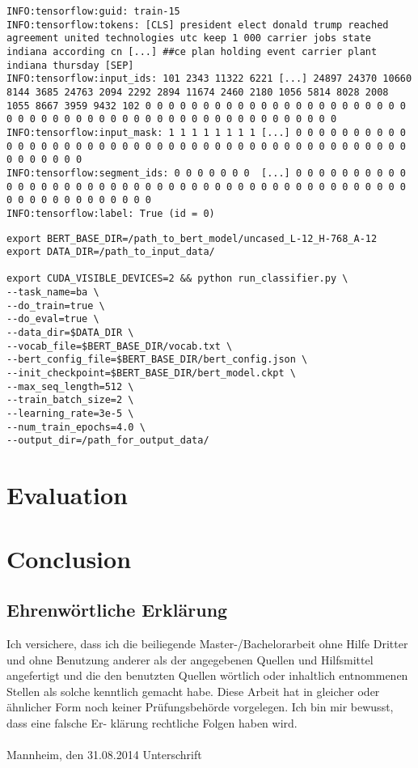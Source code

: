 \documentclass[a4paper, 11pt,titlepage,oneside,openany]{book}
\begin{document}
\noindent \begin{minipage}[t]{\textwidth}
\begin{lstlisting}[caption={TensorFlow Output for InputExampels},captionpos=b, frame = single]
INFO:tensorflow:guid: train-15
INFO:tensorflow:tokens: [CLS] president elect donald trump reached agreement united technologies utc keep 1 000 carrier jobs state indiana according cn [...] ##ce plan holding event carrier plant indiana thursday [SEP]
INFO:tensorflow:input_ids: 101 2343 11322 6221 [...] 24897 24370 10660 8144 3685 24763 2094 2292 2894 11674 2460 2180 1056 5814 8028 2008 1055 8667 3959 9432 102 0 0 0 0 0 0 0 0 0 0 0 0 0 0 0 0 0 0 0 0 0 0 0 0 0 0 0 0 0 0 0 0 0 0 0 0 0 0 0 0 0 0 0 0 0 0 0 0 0 0 0 0
INFO:tensorflow:input_mask: 1 1 1 1 1 1 1 1 [...] 0 0 0 0 0 0 0 0 0 0 0 0 0 0 0 0 0 0 0 0 0 0 0 0 0 0 0 0 0 0 0 0 0 0 0 0 0 0 0 0 0 0 0 0 0 0 0 0 0 0 0 0
INFO:tensorflow:segment_ids: 0 0 0 0 0 0 0  [...] 0 0 0 0 0 0 0 0 0 0 0 0 0 0 0 0 0 0 0 0 0 0 0 0 0 0 0 0 0 0 0 0 0 0 0 0 0 0 0 0 0 0 0 0 0 0 0 0 0 0 0 0 0 0 0 0 0 0
INFO:tensorflow:label: True (id = 0)
\end{lstlisting}
\end{minipage}
\begin{lstlisting}[caption={Example: Calling \textit{run\_classifier} with the required flags},captionpos=b, frame = single]
export BERT_BASE_DIR=/path_to_bert_model/uncased_L-12_H-768_A-12
export DATA_DIR=/path_to_input_data/

export CUDA_VISIBLE_DEVICES=2 && python run_classifier.py \
--task_name=ba \
--do_train=true \
--do_eval=true \
--data_dir=$DATA_DIR \
--vocab_file=$BERT_BASE_DIR/vocab.txt \
--bert_config_file=$BERT_BASE_DIR/bert_config.json \
--init_checkpoint=$BERT_BASE_DIR/bert_model.ckpt \
--max_seq_length=512 \
--train_batch_size=2 \
--learning_rate=3e-5 \
--num_train_epochs=4.0 \
--output_dir=/path_for_output_data/
\end{lstlisting}


\chapter{Evaluation}
\chapter{Conclusion}

{}

\pagestyle{empty}

\newpage
\section*{Ehrenw\"ortliche Erkl\"arung}
Ich versichere, dass ich die beiliegende Master-/Bachelorarbeit ohne Hilfe Dritter
und ohne Benutzung anderer als der angegebenen Quellen und Hilfsmittel
angefertigt und die den benutzten Quellen w\"ortlich oder inhaltlich
entnommenen Stellen als solche kenntlich gemacht habe. Diese Arbeit
hat in gleicher oder \"ahnlicher Form noch keiner Pr\"ufungsbeh\"orde
vorgelegen. Ich bin mir bewusst, dass eine falsche Er- kl\"arung rechtliche Folgen haben
wird.
\\
\\

\noindent
Mannheim, den 31.08.2014 \hspace{4cm} Unterschrift
\end{document}
